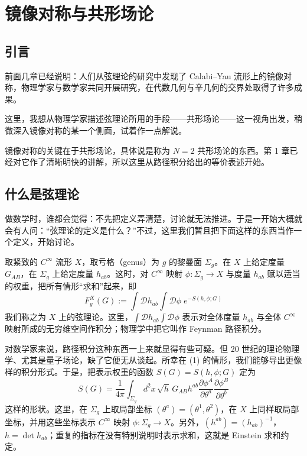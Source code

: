 \renewcommand{\thesection}{\arabic{section}}

\chapter{镜像对称与共形场论}

\section{引言}

前面几章已经说明：人们从弦理论的研究中发现了 Calabi--Yau 流形上的镜像对称，物理学家与数学家共同开展研究，在代数几何与辛几何的交界处取得了许多成果。

这里，我想从物理学家描述弦理论所用的手段——共形场论——这一视角出发，稍微深入镜像对称的某一个侧面，试着作一点解说。

镜像对称的关键在于共形场论，具体说是称为 $N=2$ 共形场论的东西。第 1 章已经对它作了清晰明快的讲解，所以这里从路径积分给出的等价表述开始。

\section{什么是弦理论}

做数学时，谁都会觉得：不先把定义弄清楚，讨论就无法推进。于是一开始大概就会有人问：“弦理论的定义是什么？”不过，这里我们暂且把下面这样的东西当作一个定义，开始讨论。

取紧致的 $C^\infty$ 流形 $X$，取亏格（genus）为 $g$ 的黎曼面 $\Sigma_g$。在 $X$ 上给定度量 $G_{AB}$，在 $\Sigma_g$ 上给定度量 $h_{ab}$。这时，对 $C^\infty$ 映射 $\phi\colon\Sigma_g\to X$ 与度量 $h_{ab}$ 赋以适当的权重，把所有情形“求和”起来，即
\begin{equation}
  F_g^X(G) := \int \mathcal{D}h_{ab}\int \mathcal{D}\phi\; e^{-S(h,\phi;G)}
  \tag{1}
\end{equation}
我们称之为 $X$ 上的弦理论。这里，$\int\mathcal{D}h_{ab}\int\mathcal{D}\phi$ 表示对全体度量 $h_{ab}$ 与全体 $C^\infty$ 映射所成的无穷维空间作积分；物理学中把它叫作 Feynman 路径积分。

对数学家来说，路径积分这种东西一上来就显得有些可疑。但 20 世纪的理论物理学、尤其是量子场论，缺了它便无从谈起。所幸在 (1) 的情形，我们能够导出更像样的积分形式。于是，把表示权重的函数 $S(G)=S(h,\phi;G)$ 定为
\begin{equation}
  S(G)=\frac{1}{4\pi}\int_{\Sigma_g} d^2x\,\sqrt{h}\,G_{AB}h^{ab}
  \frac{\partial\phi^A}{\partial\theta^a}\frac{\partial\phi^B}{\partial\theta^b}
  \tag{2}
\end{equation}
这样的形状。这里，在 $\Sigma_g$ 上取局部坐标 $(\theta^a)=(\theta^1,\theta^2)$，在 $X$ 上同样取局部坐标，并用这些坐标表示 $C^\infty$ 映射 $\phi\colon\Sigma_g\to X$。另外，$(h^{ab})=(h_{ab})^{-1}$，$h=\det h_{ab}$；重复的指标在没有特别说明时表示求和，这就是 Einstein 求和约定。

